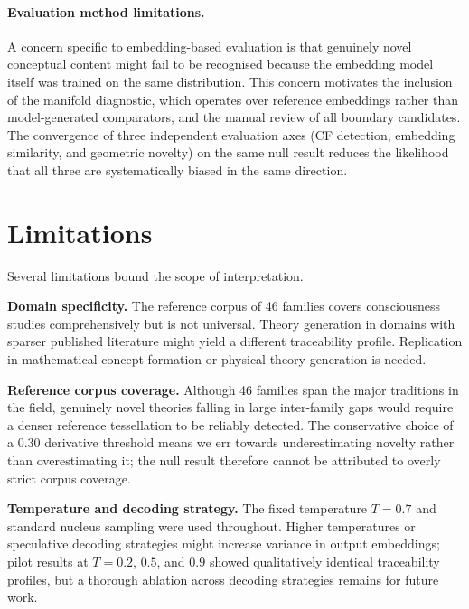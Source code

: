 \documentclass[pdflatex,sn-mathphys-num]{sn-jnl}
\begin{document}
\paragraph{Evaluation method limitations.}
A concern specific to embedding-based evaluation is that genuinely novel
conceptual content might fail to be recognised because the embedding model itself
was trained on the same distribution.  This concern motivates the inclusion of
the manifold diagnostic, which operates over reference embeddings rather than
model-generated comparators, and the manual review of all boundary candidates.
The convergence of three independent evaluation axes (CF detection, embedding
similarity, and geometric novelty) on the same null result reduces the
likelihood that all three are systematically biased in the same direction.

\section{Limitations}
\label{sec:limitations}

Several limitations bound the scope of interpretation.

\textbf{Domain specificity.}
The reference corpus of 46 families covers consciousness studies comprehensively
but is not universal.  Theory generation in domains with sparser published
literature might yield a different traceability profile.  Replication in
mathematical concept formation or physical theory generation is needed.

\textbf{Reference corpus coverage.}
Although 46 families span the major traditions in the field, genuinely novel
theories falling in large inter-family gaps would require a denser reference
tessellation to be reliably detected.  The conservative choice of a $0.30$
derivative threshold means we err towards underestimating novelty rather than
overestimating it; the null result therefore cannot be attributed to overly
strict corpus coverage.

\textbf{Temperature and decoding strategy.}
The fixed temperature $T=0.7$ and standard nucleus sampling were used throughout.
Higher temperatures or speculative decoding strategies might increase variance
in output embeddings; pilot results at $T=0.2$, $0.5$, and $0.9$ showed
qualitatively identical traceability profiles, but a thorough ablation across
decoding strategies remains for future work.
\end{document}

